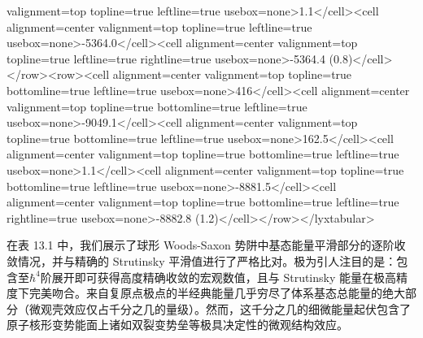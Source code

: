 \begin{table}[H]
valignment=\textquotedbl top\textquotedbl{} topline=\textquotedbl true\textquotedbl{}
leftline=\textquotedbl true\textquotedbl{} usebox=\textquotedbl none\textquotedbl >1.1</cell><cell
alignment=\textquotedbl center\textquotedbl{} valignment=\textquotedbl top\textquotedbl{}
topline=\textquotedbl true\textquotedbl{} leftline=\textquotedbl true\textquotedbl{}
usebox=\textquotedbl none\textquotedbl >-5364.0</cell><cell alignment=\textquotedbl center\textquotedbl{}
valignment=\textquotedbl top\textquotedbl{} topline=\textquotedbl true\textquotedbl{}
leftline=\textquotedbl true\textquotedbl{} rightline=\textquotedbl true\textquotedbl{}
usebox=\textquotedbl none\textquotedbl >-5364.4 (0.8)</cell></row><row><cell
alignment=\textquotedbl center\textquotedbl{} valignment=\textquotedbl top\textquotedbl{}
topline=\textquotedbl true\textquotedbl{} bottomline=\textquotedbl true\textquotedbl{}
leftline=\textquotedbl true\textquotedbl{} usebox=\textquotedbl none\textquotedbl >416</cell><cell
alignment=\textquotedbl center\textquotedbl{} valignment=\textquotedbl top\textquotedbl{}
topline=\textquotedbl true\textquotedbl{} bottomline=\textquotedbl true\textquotedbl{}
leftline=\textquotedbl true\textquotedbl{} usebox=\textquotedbl none\textquotedbl >-9049.1</cell><cell
alignment=\textquotedbl center\textquotedbl{} valignment=\textquotedbl top\textquotedbl{}
topline=\textquotedbl true\textquotedbl{} bottomline=\textquotedbl true\textquotedbl{}
leftline=\textquotedbl true\textquotedbl{} usebox=\textquotedbl none\textquotedbl >162.5</cell><cell
alignment=\textquotedbl center\textquotedbl{} valignment=\textquotedbl top\textquotedbl{}
topline=\textquotedbl true\textquotedbl{} bottomline=\textquotedbl true\textquotedbl{}
leftline=\textquotedbl true\textquotedbl{} usebox=\textquotedbl none\textquotedbl >1.1</cell><cell
alignment=\textquotedbl center\textquotedbl{} valignment=\textquotedbl top\textquotedbl{}
topline=\textquotedbl true\textquotedbl{} bottomline=\textquotedbl true\textquotedbl{}
leftline=\textquotedbl true\textquotedbl{} usebox=\textquotedbl none\textquotedbl >-8881.5</cell><cell
alignment=\textquotedbl center\textquotedbl{} valignment=\textquotedbl top\textquotedbl{}
topline=\textquotedbl true\textquotedbl{} bottomline=\textquotedbl true\textquotedbl{}
leftline=\textquotedbl true\textquotedbl{} rightline=\textquotedbl true\textquotedbl{}
usebox=\textquotedbl none\textquotedbl >-8882.8 (1.2)</cell></row></lyxtabular>
\end{table}

在表 13.1 中，我们展示了球形 Woods-Saxon 势阱中基态能量平滑部分的逐阶收敛情况，并与精确的 Strutinsky
平滑值进行了严格比对。极为引人注目的是：包含至$\hbar^{4}$阶展开即可获得高度精确收敛的宏观数值，且与 Strutinsky
能量在极高精度下完美吻合。来自复原点极点的半经典能量几乎穷尽了体系基态总能量的绝大部分（微观壳效应仅占千分之几的量级）。然而，这千分之几的细微能量起伏包含了原子核形变势能面上诸如双裂变势垒等极具决定性的微观结构效应。

